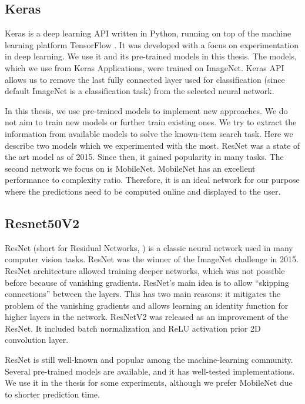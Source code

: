 \subsection{Keras}

Keras \citep{chollet2015keras} is a deep learning API written in Python, running on top of the machine learning platform TensorFlow \citep{tensorflow2015-whitepaper}. It was developed with a focus on experimentation in deep learning. We use it and its pre-trained models in this thesis. The models, which we use from Keras Applications, were trained on ImageNet. Keras API allows us to remove the last fully connected layer used for classification (since default ImageNet is a classification task) from the selected neural network.

In this thesis, we use pre-trained models to implement new approaches. We do not aim to train new models or further train existing ones. We try to extract the information from available models to solve the known-item search task. Here we describe two models which we experimented with the most. ResNet was a state of the art model as of 2015. Since then, it gained popularity in many tasks. The second network we focus on is MobileNet. MobileNet has an excellent performance to complexity ratio. Therefore, it is an ideal network for our purpose where the predictions need to be computed online and displayed to the user.

\subsection*{Resnet50V2}

ResNet (short for Residual Networks, \cite{resnet}) is a classic neural network used in many computer vision tasks. ResNet was the winner of the ImageNet challenge in 2015. ResNet architecture allowed training deeper networks, which was not possible before because of vanishing gradients. ResNet's main idea is to allow ``skipping connections'' between the layers. This has two main reasons: it mitigates the problem of the vanishing gradients and allows learning an identity function for higher layers in the network. ResNetV2 \citep{resnetv2} was released as an improvement of the ResNet. It included batch normalization and ReLU activation prior 2D convolution layer. 

ResNet is still well-known and popular among the machine-learning community. Several pre-trained models are available, and it has well-tested implementations. We use it in the thesis for some experiments, although we prefer MobileNet due to shorter prediction time.

